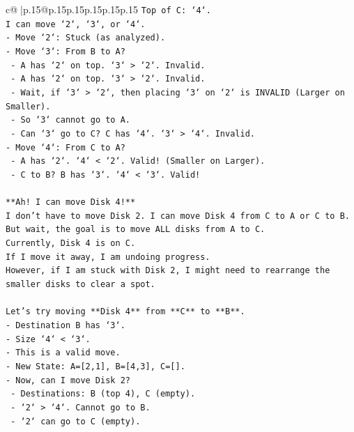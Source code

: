 \documentclass{article}
\begin{document}
{\begin{supertabular}{c@{$\;$}|p{.15\linewidth}@{}p{.15\linewidth}p{.15\linewidth}p{.15\linewidth}p{.15\linewidth}p{.15\linewidth}}
{{{\texttt{Top of C: `4`.} \\
\texttt{I can move `2`, `3`, or `4`.} \\
\texttt{{-} Move `2`: Stuck (as analyzed).} \\
\texttt{{-} Move `3`: From B to A?} \\
\texttt{  {-} A has `2` on top. `3` > `2`. Invalid.} \\
\texttt{  {-} A has `2` on top. `3` > `2`. Invalid.} \\
\texttt{  {-} Wait, if `3` > `2`, then placing `3` on `2` is INVALID (Larger on Smaller).} \\
\texttt{  {-} So `3` cannot go to A.} \\
\texttt{  {-} Can `3` go to C? C has `4`. `3` > `4`. Invalid.} \\
\texttt{{-} Move `4`: From C to A?} \\
\texttt{  {-} A has `2`. `4` < `2`. Valid! (Smaller on Larger).} \\
\texttt{  {-} C to B? B has `3`. `4` < `3`. Valid!} \\
\\ 
\texttt{**Ah! I can move Disk 4!**} \\
\texttt{I don't have to move Disk 2. I can move Disk 4 from C to A or C to B.} \\
\texttt{But wait, the goal is to move ALL disks from A to C.} \\
\texttt{Currently, Disk 4 is on C.} \\
\texttt{If I move it away, I am undoing progress.} \\
\texttt{However, if I am stuck with Disk 2, I might need to rearrange the smaller disks to clear a spot.} \\
\\ 
\texttt{Let's try moving **Disk 4** from **C** to **B**.} \\
\texttt{{-} Destination B has `3`.} \\
\texttt{{-} Size `4` < `3`.} \\
\texttt{{-} This is a valid move.} \\
\texttt{{-} New State: A={[}2,1{]}, B={[}4,3{]}, C={[}{]}.} \\
\texttt{{-} Now, can I move Disk 2?} \\
\texttt{  {-} Destinations: B (top 4), C (empty).} \\
\texttt{  {-} `2` > `4`. Cannot go to B.} \\
\texttt{  {-} `2` can go to C (empty).} \\
}}}
\end{supertabular}}
\end{document}
